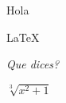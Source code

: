 \documentclass{article}
\begin{document}
Hola

\LaTeX

\emph{Que dices?}

$\sqrt[3]{x^2+1}$
\end{document}
